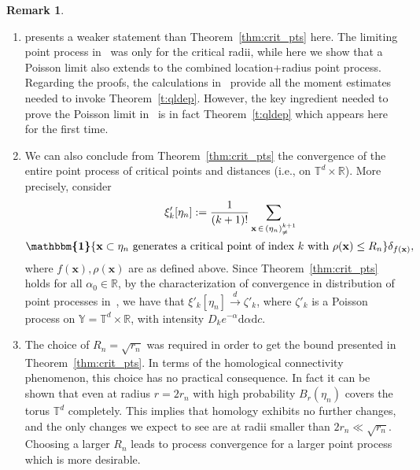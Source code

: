 \documentclass[10pt]{amsart}
\theoremstyle{definition}\newtheorem{defi}[theo]{Definition}\newtheorem{rema}[theo]{Remark}\newtheorem{exam}[theo]{Example}\newtheorem{exem}[theo]{Example}\newtheorem{nota}[theo]{Notation}
\newcommand{\bx}{\mathbf{x}}
\newcommand*\R{\mathbb{R}}
\newcommand*\T{\mathbb{T}}
\newcommand*\Y{\mathbb{Y}}
\newcommand*\md{\mathrm{d}}
\newcommand{\ind}{\boldsymbol{\mathbbm{1}}}
\begin{document}
\pagebreak
\begin{rema}\label{r:critpts}
\leavevmode
\begin{enumerate}
\item \cite[Theorem~8.1]{Bobrowski2019} presents a weaker statement than Theorem~\ref{thm:crit_pts} here. The limiting point process in~\cite{Bobrowski2019} was only for the critical radii, while here we show that a Poisson limit also extends to the combined location+radius point process. Regarding the proofs, the calculations in~\cite{Bobrowski2019} provide all the moment estimates needed to invoke Theorem~\ref{t:qldep}. However, the key ingredient needed to prove the Poisson limit in~\cite{Bobrowski2019} is in fact Theorem~\ref{t:qldep} which appears here for the first time.

\item We can also conclude from Theorem~\ref{thm:crit_pts} the convergence of the entire point process of critical points and distances (i.e., on $\T^d\times\R$). More precisely, consider
\begin{multline*}
\mkern35mu \xi'_k[\eta_n]
:= \frac{1}{(k+1)!} \sum_{\bx\,\in\,\left(\eta_n\right)^{k+1}_{\neq}}\\
 \ind\{\bx \subset \eta_n \text{ generates a critical point of index $k$ with }\rho(\bx) \leq R_n\}\delta_{f(\bx)},
\end{multline*}
where $f(\bx), \rho(\bx)$ are as defined above. Since Theorem~\ref{thm:crit_pts} holds for all $\alpha_0 \in \R$, {by the characterization of convergence in distribution of point processes in~\cite[Theorem~16.16]{KallenbergFoundations}}, we have that $\xi'_k[\eta_n] \stackrel{d}{\to} \zeta'_k$, where $\zeta'_k$ is a Poisson process on $\Y = \T^d\times \R$, with intensity $D_k e^{-\alpha}\md\alpha \md c$.

\item The choice of $R_n = \sqrt{r_n}$ was required in order to get the bound presented in Theorem~\ref{thm:crit_pts}. In terms of the homological connectivity phenomenon, this choice has no practical consequence. In fact it can be shown that even at radius $r=2r_n$ with high probability $B_r(\eta_n)$ covers the torus $\T^d$ completely. This implies that homology exhibits no further changes, and the only changes we expect to see are at radii smaller than $2r_n \ll \sqrt{r_n}$. Choosing a larger $R_n$ leads to process convergence for a larger point process which is more desirable.
\end{enumerate}

\end{rema}
\end{document}
